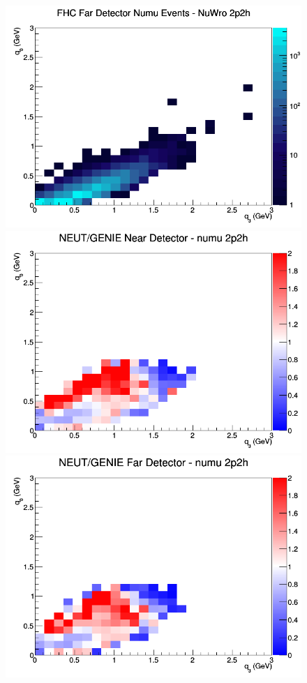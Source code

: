 \documentclass[12pt]{article}
\begin{document}
\begin{figure}[h]
\endminipage
{}
\includegraphics[width=\linewidth]{eff_q0_q3/LAr/2p2h_FHC_FD_numu_q3_q0_NuWro.png}
\endminipage
\newline
{}
\includegraphics[width=\linewidth]{eff_q0_q3/LAr/ratios/2p2h_NEUT_GENIE_numu_near_q3_q0.png}
\endminipage
{}
\includegraphics[width=\linewidth]{eff_q0_q3/LAr/ratios/2p2h_NEUT_GENIE_numu_far_q3_q0.png}

\end{figure}
\end{document}
